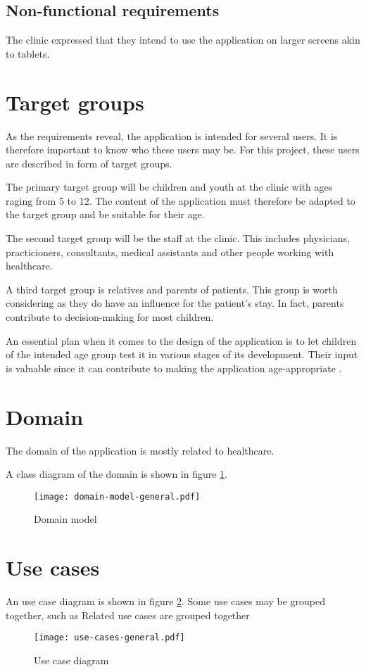 \subsection{Non-functional requirements}

The clinic expressed that they intend to use the application on larger screens akin to tablets.

\section{Target groups}

As the requirements reveal, the application is intended for several users. It is therefore important to know who these users may be. For this project, these users are described in form of target groups.

The primary target group will be children and youth at the clinic with ages raging from 5 to 12. The content of the application must therefore be adapted to the target group and be suitable for their age.

The second target group will be the staff at the clinic. This includes physicians, practicioners, consultants, medical assistants and other people working with healthcare.

A third target group is relatives and parents of patients. This group is worth considering as they do have an influence for the patient's stay. In fact, parents contribute to decision-making for most children.

An essential plan when it comes to the design of the application is to let children of the intended age group test it in various stages of its development. Their input is valuable since it can contribute to making the application age-appropriate \parencite{stalberg2016}.

\section{Domain}

The domain of the application is mostly related to healthcare.

A class diagram of the domain is shown in figure \ref{fig:domain1}.


\begin{figure}
    \centering
    \texttt{[image: domain-model-general.pdf]}
    \caption{Domain model}
    \label{fig:domain1}
\end{figure}

\section{Use cases}

An use case diagram is shown in figure \ref{fig:usecases1}. Some use cases may be grouped together, such as Related use cases are grouped together


\begin{figure}
    \centering
    \texttt{[image: use-cases-general.pdf]}
    \caption{Use case diagram}
    \label{fig:usecases1}
\end{figure}
